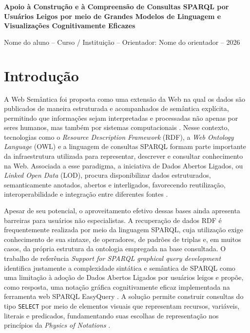 \documentclass[10pt,a4paper]{article}
\begin{document}
\begin{center}
    {\large\bfseries Apoio à Construção e à Compreensão de Consultas SPARQL por Usuários Leigos por meio de Grandes Modelos de Linguagem e Visualizações Cognitivamente Eficazes\par}
    \vspace{0.4em}
    {\small Nome do aluno -- Curso / Instituição -- Orientador: Nome do orientador -- 2026}
\end{center}
\vspace{-0.5em}

\section{Introdução}

A Web Semântica foi proposta como uma extensão da Web na qual os dados são publicados de maneira estruturada e acompanhados de semântica explícita, permitindo que informações sejam interpretadas e processadas não apenas por seres humanos, mas também por sistemas computacionais \cite{berners2001}. Nesse contexto, tecnologias como o \textit{Resource Description Framework} (RDF), a \textit{Web Ontology Language} (OWL) e a linguagem de consultas SPARQL formam parte importante da infraestrutura utilizada para representar, descrever e consultar conhecimento na Web. Associada a esse paradigma, a iniciativa de Dados Abertos Ligados, ou \textit{Linked Open Data} (LOD), procura disponibilizar dados estruturados, semanticamente anotados, abertos e interligados, favorecendo reutilização, interoperabilidade e integração entre diferentes fontes \cite{isotani2015}.

Apesar de seu potencial, o aproveitamento efetivo dessas bases ainda apresenta barreiras para usuários não especialistas. A recuperação de dados RDF é frequentemente realizada por meio da linguagem SPARQL, cuja utilização exige conhecimento de sua sintaxe, de operadores, de padrões de triplas e, em muitos casos, da própria estrutura da ontologia empregada na base consultada. O trabalho de referência \textit{Support for SPARQL graphical query development} identifica justamente a complexidade sintática e semântica de SPARQL como uma limitação à adoção de Dados Abertos Ligados por usuários leigos e propõe, como resposta, uma notação gráfica cognitivamente eficaz implementada na ferramenta web SPARQL EasyQuery \cite{easyquery}. A solução permite construir consultas do tipo \texttt{SELECT} por meio de elementos visuais que representam recursos, variáveis, literais e predicados, fundamentando suas escolhas de representação nos princípios da \textit{Physics of Notations} \cite{moody2009}.
\end{document}
